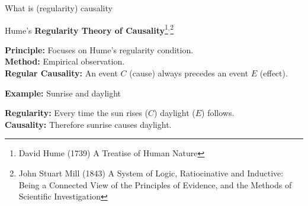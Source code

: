 \documentclass[aspectratio=169]{beamer}
\begin{document}
\begin{frame}{What is (regularity) causality}
\vspace{-0.2cm}

\begin{center}
    Hume's \textbf{Regularity Theory of Causality}\footnote{\scriptsize David Hume (1739) A Treatise of Human Nature}$^,$\footnote{    
\scriptsize John Stuart Mill (1843) A System of Logic, Ratiocinative and Inductive: Being a Connected View of the Principles of Evidence, and the Methods of Scientific Investigation}
\end{center}

    \textbf{Principle:} Focuses on Hume's regularity condition. \\
    \textbf{Method:} Empirical observation. \\
    \textbf{Regular Causality:} An event $C$ (cause) always precedes an event $E$ (effect). \\
\vspace{0.6cm}

\begin{center}
    \textbf{Example:} Sunrise and daylight
\end{center}

\textbf{Regularity:} Every time the sun rises ($C$) daylight ($E$) follows. \\
\textbf{Causality:} Therefore sunrise causes daylight.
        
\end{frame}
\end{document}
